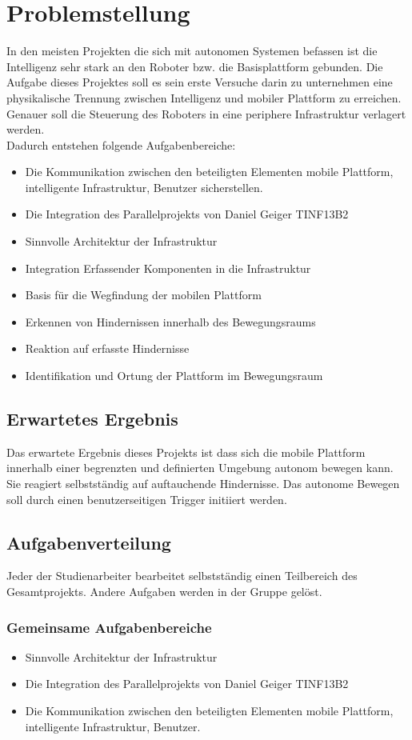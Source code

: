 
\chapter{Problemstellung}
In den meisten Projekten die sich mit autonomen Systemen befassen ist die Intelligenz sehr stark an den Roboter bzw. die Basisplattform gebunden. Die Aufgabe dieses Projektes soll es sein erste Versuche darin zu unternehmen eine physikalische Trennung zwischen Intelligenz und mobiler Plattform zu erreichen. Genauer soll die Steuerung des Roboters in eine periphere Infrastruktur verlagert werden.\\
Dadurch entstehen folgende Aufgabenbereiche:
\begin{itemize}
\item Die Kommunikation zwischen den beteiligten Elementen mobile Plattform, intelligente Infrastruktur, Benutzer sicherstellen.
\item Die Integration des Parallelprojekts von Daniel Geiger TINF13B2
\item Sinnvolle Architektur der Infrastruktur
\item Integration Erfassender Komponenten in die Infrastruktur
\item Basis für die Wegfindung der mobilen Plattform
\item Erkennen von Hindernissen innerhalb des Bewegungsraums
\item Reaktion auf erfasste Hindernisse
\item Identifikation und Ortung der Plattform im Bewegungsraum
\end{itemize}
\section{Erwartetes Ergebnis}
Das erwartete Ergebnis dieses Projekts ist dass sich die mobile Plattform innerhalb einer begrenzten und definierten Umgebung autonom bewegen kann. Sie reagiert selbstständig auf auftauchende Hindernisse. Das autonome Bewegen soll durch einen benutzerseitigen Trigger initiiert werden.
\section{Aufgabenverteilung}
Jeder der Studienarbeiter bearbeitet selbstständig einen Teilbereich des Gesamtprojekts. Andere Aufgaben werden in der Gruppe gelöst.

\subsection{Gemeinsame Aufgabenbereiche}
\begin{itemize}
\item Sinnvolle Architektur der Infrastruktur
\item Die Integration des Parallelprojekts von Daniel Geiger TINF13B2
\item Die Kommunikation zwischen den beteiligten Elementen mobile Plattform, intelligente Infrastruktur, Benutzer.
\end{itemize}

